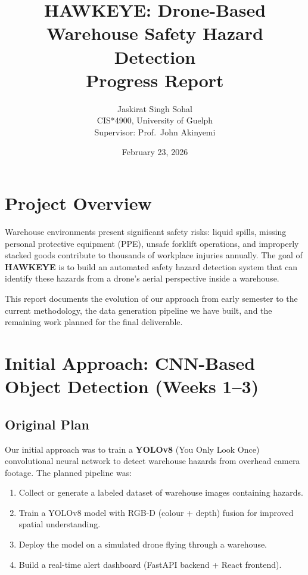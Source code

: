 \documentclass[12pt, a4paper]{article}
\title{\textbf{HAWKEYE: Drone-Based Warehouse Safety Hazard Detection} \\ \large Progress Report}
\author{Jaskirat Singh Sohal \\ CIS*4900, University of Guelph \\ Supervisor: Prof.\ John Akinyemi}
\date{February 23, 2026}
\begin{document}
\maketitle

\section{Project Overview}

Warehouse environments present significant safety risks: liquid spills, missing personal protective equipment (PPE), unsafe forklift operations, and improperly stacked goods contribute to thousands of workplace injuries annually. The goal of \textbf{HAWKEYE} is to build an automated safety hazard detection system that can identify these hazards from a drone's aerial perspective inside a warehouse.

This report documents the evolution of our approach from early semester to the current methodology, the data generation pipeline we have built, and the remaining work planned for the final deliverable.

\section{Initial Approach: CNN-Based Object Detection (Weeks 1--3)}

\subsection{Original Plan}

Our initial approach was to train a \textbf{YOLOv8} (You Only Look Once) convolutional neural network to detect warehouse hazards from overhead camera footage. The planned pipeline was:

\begin{enumerate}
    \item Collect or generate a labeled dataset of warehouse images containing hazards.
    \item Train a YOLOv8 model with RGB-D (colour + depth) fusion for improved spatial understanding.
    \item Deploy the model on a simulated drone flying through a warehouse.
    \item Build a real-time alert dashboard (FastAPI backend + React frontend).
\end{enumerate}
\end{document}
